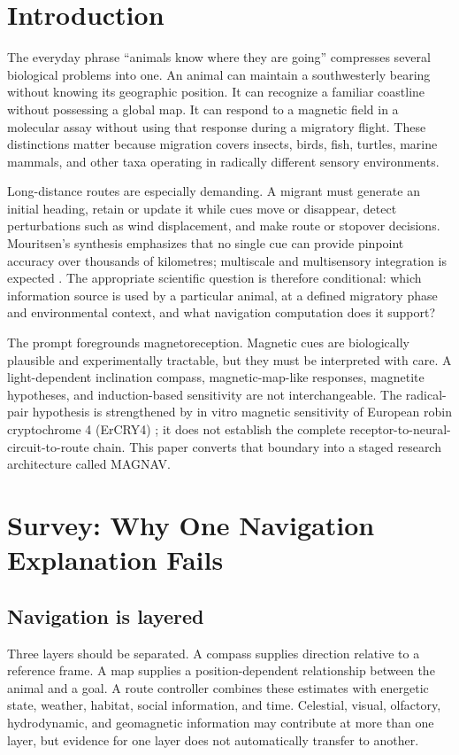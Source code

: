 \documentclass[conference]{IEEEtran}
\begin{document}
\section{Introduction}
The everyday phrase ``animals know where they are going'' compresses several biological problems into one. An animal can maintain a southwesterly bearing without knowing its geographic position. It can recognize a familiar coastline without possessing a global map. It can respond to a magnetic field in a molecular assay without using that response during a migratory flight. These distinctions matter because migration covers insects, birds, fish, turtles, marine mammals, and other taxa operating in radically different sensory environments.

Long-distance routes are especially demanding. A migrant must generate an initial heading, retain or update it while cues move or disappear, detect perturbations such as wind displacement, and make route or stopover decisions. Mouritsen's synthesis emphasizes that no single cue can provide pinpoint accuracy over thousands of kilometres; multiscale and multisensory integration is expected \cite{mouritsen2018}. The appropriate scientific question is therefore conditional: which information source is used by a particular animal, at a defined migratory phase and environmental context, and what navigation computation does it support?

The prompt foregrounds magnetoreception. Magnetic cues are biologically plausible and experimentally tractable, but they must be interpreted with care. A light-dependent inclination compass, magnetic-map-like responses, magnetite hypotheses, and induction-based sensitivity are not interchangeable. The radical-pair hypothesis is strengthened by in vitro magnetic sensitivity of European robin cryptochrome 4 (ErCRY4) \cite{xu2021}; it does not establish the complete receptor-to-neural-circuit-to-route chain. This paper converts that boundary into a staged research architecture called MAGNAV.

\section{Survey: Why One Navigation Explanation Fails}\label{sec:survey}
\subsection{Navigation is layered}
Three layers should be separated. A compass supplies direction relative to a reference frame. A map supplies a position-dependent relationship between the animal and a goal. A route controller combines these estimates with energetic state, weather, habitat, social information, and time. Celestial, visual, olfactory, hydrodynamic, and geomagnetic information may contribute at more than one layer, but evidence for one layer does not automatically transfer to another.
\end{document}
